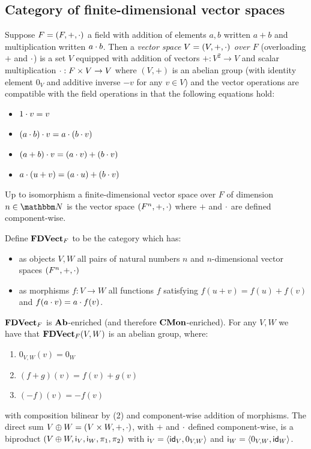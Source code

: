 \subsection{Category of finite-dimensional vector spaces}
\label{sec:categories-with-biproducts:fdvect}

\begin{definition}
Suppose $F = (F, +, \cdot)$ a field with addition of elements $a, b$ written $a + b$ and multiplication
written $a \cdot b$. Then a \emph{vector space $V = (V, +, \cdot)$ over $F$} (overloading $+$ and $\cdot$) is
a set $V$ equipped with addition of vectors $+: V^2 \to V$ and scalar multiplication $\cdot: F \times V \to V$
where $(V,+)$ is an abelian group (with identity element $0_V$ and additive inverse $-v$ for any $v \in V$)
and the vector operations are compatible with the field operations in that the following equations hold:
\begin{itemize}
\item $1 \cdot v = v$
\item $(a \cdot b) \cdot v = a \cdot (b \cdot v)$
\item $(a + b) \cdot v = (a \cdot v) + (b \cdot v)$
\item $a \cdot (u + v) = (a \cdot u) + (b \cdot v)$
\end{itemize}
\end{definition}

Up to isomorphism a finite-dimensional vector space over $F$ of dimension $n \in \Nat$ is the vector space
$(F^n, +, \cdot)$ where $+$ and $\cdot$ are defined component-wise.

\begin{definition}
Define $\mathbf{FDVect}_F$ to be the category which has:
\begin{itemize}
\item as objects $V, W$ all pairs of natural numbers $n$ and $n$-dimensional vector spaces $(F^n, +, \cdot)$
\item as morphisms $f: V \to W$ all functions $f$ satisfying $f(u + v) = f(u) + f(v)$ and $f(a \cdot v) = a
\cdot f(v)$.
\end{itemize}
\end{definition}

$\mathbf{FDVect}_F$ is $\mathbf{Ab}$-enriched (and therefore $\mathbf{CMon}$-enriched). For any $V, W$ we have that $\mathbf{FDVect}_F(V,W)$
is an abelian group, where:
\begin{enumerate}
\item $0_{V,W}(v) = 0_W$
\item $(f + g)(v) = f(v) + g(v)$
\item $(-f)(v) = -f(v)$
\end{enumerate}
\noindent with composition bilinear by (2) and component-wise addition of morphisms. The direct sum $V \oplus
W = (V \times W, +, \cdot)$, with $+$ and $\cdot$ defined component-wise, is a biproduct $(V \oplus W,
\mathsf{i}_V, \mathsf{i}_W, \pi_1, \pi_2)$ with $\mathsf{i}_V = \langle \mathsf{id}_V, 0_{V,W}\rangle$ and $\mathsf{i}_W =
\langle 0_{V,W}, \mathsf{id}_W\rangle$.

